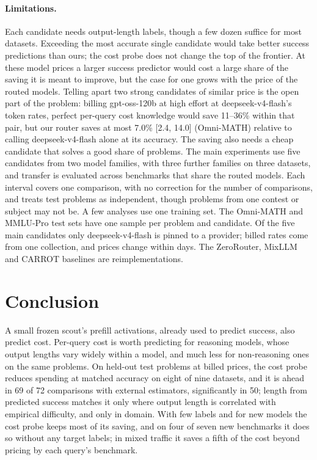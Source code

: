 \documentclass[10pt]{article}
\begin{document}
\paragraph{Limitations.}
Each candidate needs output-length labels, though a few dozen suffice for most datasets. Exceeding the most accurate single candidate would take better success predictions than ours; the cost probe does not change the top of the frontier. At these model prices a larger success predictor would cost a large share of the saving it is meant to improve, but the case for one grows with the price of the routed models. Telling apart two strong candidates of similar price is the open part of the problem: billing gpt-oss-120b at high effort at deepseek-v4-flash's token rates, perfect per-query cost knowledge would save 11--36\% within that pair, but our router saves at most 7.0\% [2.4, 14.0] (Omni-MATH) relative to calling deepseek-v4-flash alone at its accuracy. The saving also needs a cheap candidate that solves a good share of problems. The main experiments use five candidates from two model families, with three further families on three datasets, and transfer is evaluated across benchmarks that share the routed models. Each interval covers one comparison, with no correction for the number of comparisons, and treats test problems as independent, though problems from one contest or subject may not be. A few analyses use one training set. The Omni-MATH and MMLU-Pro test sets have one sample per problem and candidate. Of the five main candidates only deepseek-v4-flash is pinned to a provider; billed rates come from one collection, and prices change within days. The ZeroRouter, MixLLM and CARROT baselines are reimplementations.

\section{Conclusion}
A small frozen scout's prefill activations, already used to predict success, also predict cost. Per-query cost is worth predicting for reasoning models, whose output lengths vary widely within a model, and much less for non-reasoning ones on the same problems. On held-out test problems at billed prices, the cost probe reduces spending at matched accuracy on eight of nine datasets, and it is ahead in 69 of 72 comparisons with external estimators, significantly in 50; length from predicted success matches it only where output length is correlated with empirical difficulty, and only in domain. With few labels and for new models the cost probe keeps most of its saving, and on four of seven new benchmarks it does so without any target labels; in mixed traffic it saves a fifth of the cost beyond pricing by each query's benchmark.
\end{document}
